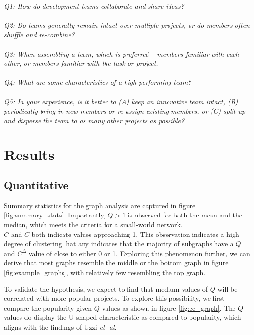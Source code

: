 \documentclass{proc}
\begin{document}
\noindent\\\textit{Q1: How do development teams collaborate and share ideas?}\\
\noindent\\\textit{Q2: Do teams generally remain intact over multiple projects, or do members often shuffle and re-combine?}\\
\noindent\\\textit{Q3: When assembling a team, which is preferred -- members familiar with each other, or members familiar with the task or project.}\\
\noindent\\\textit{Q4: What are some characteristics of a high performing team?}\\
\noindent\\\textit{Q5: In your experience, is it better to (A) keep an innovative team intact, (B) periodically bring in new members or re-assign existing members, or (C) split up and disperse the team to as many other projects as possible?}\\
 

\section{Results}

\subsection{Quantitative}




Summary statistics for the graph analysis are captured in figure \ref{fig:summary_stats}. Importantly, $Q > 1$ is observed for both the mean and the median, which meets the criteria for a small-world network\cite{humphries2008network}.\\

$C$ and $\overline{C}$ both indicate values approaching 1. This observation indicates a high degree of clustering\cite{watts1998collective}. hat any indicates that the majority of subgraphs have a $Q$ and $C^\Delta$ value of close to either 0 or 1. Exploring this phenomenon further, we can derive that most graphs resemble the middle or the bottom graph in figure \ref{fig:example_graphs}, with relatively few resembling the top graph.

To validate the hypothesis, we expect to find that medium values of $Q$ will be correlated with more popular projects. To explore this possibility, we first compare the popularity given $Q$ values as shown in figure \ref{fig:cc_graph}. The $Q$ values do display the U-shaped characteristic as compared to popularity, which aligns with the findings of Uzzi \textit{et. al}\cite{uzzi2005collaboration}.
\end{document}
